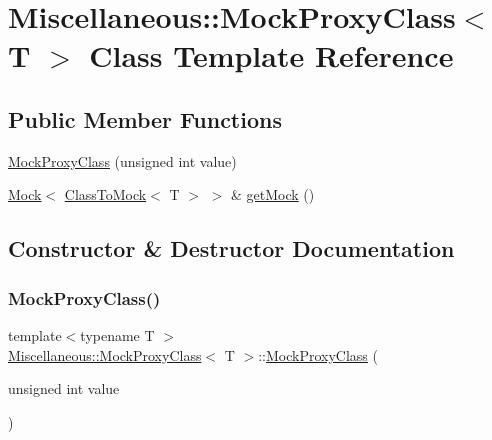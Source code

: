 \hypertarget{classMiscellaneous_1_1MockProxyClass}{}\section{Miscellaneous\+::Mock\+Proxy\+Class$<$ T $>$ Class Template Reference}
\label{classMiscellaneous_1_1MockProxyClass}
\subsection*{Public Member Functions}
\begin{DoxyCompactItemize}
\item 
\mbox{\hyperlink{classMiscellaneous_1_1MockProxyClass_a1c630575873666abd4f86bd521fbf449}{Mock\+Proxy\+Class}} (unsigned int value)
\item 
\mbox{\hyperlink{classfakeit_1_1Mock}{Mock}}$<$ \mbox{\hyperlink{classMiscellaneous_1_1ClassToMock}{Class\+To\+Mock}}$<$ T $>$ $>$ \& \mbox{\hyperlink{classMiscellaneous_1_1MockProxyClass_a8b704287e66d039c9dd566bf8d9cdf96}{get\+Mock}} ()
\end{DoxyCompactItemize}


\subsection{Constructor \& Destructor Documentation}
\mbox{\label{classMiscellaneous_1_1MockProxyClass_a1c630575873666abd4f86bd521fbf449}} 
\subsubsection{\texorpdfstring{MockProxyClass()}{MockProxyClass()}}
{\footnotesize\ttfamily template$<$typename T $>$ \\
\mbox{\hyperlink{classMiscellaneous_1_1MockProxyClass}{Miscellaneous\+::\+Mock\+Proxy\+Class}}$<$ T $>$\+::\mbox{\hyperlink{classMiscellaneous_1_1MockProxyClass}{Mock\+Proxy\+Class}} (\begin{DoxyParamCaption}\item[{unsigned int}]{value }\end{DoxyParamCaption})\hspace{0.3cm}{\ttfamily [inline]}}



